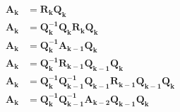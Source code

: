 \documentclass{article}
\newcommand{\mat}[1]{\mathbf{#1}}
\begin{document}
\begin{align}
  \mat{A_k} &= \mat{R_k}\mat{Q_k} \nonumber \\
  \mat{A_k} &= \mat{Q_k^{-1}}\mat{Q_k}\mat{R_k}\mat{Q_k} \nonumber \\
  \mat{A_k} &= \mat{Q_k^{-1}}\mat{A_{k-1}}\mat{Q_k} \nonumber \\
  \mat{A_k} &= \mat{Q_k^{-1}}\mat{R_{k-1}}\mat{Q_{k-1}}\mat{Q_k} \nonumber \\
  \mat{A_k} &= \mat{Q_k^{-1}}\mat{Q_{k-1}^{-1}}\mat{Q_{k-1}}\mat{R_{k-1}}\mat{Q_{k-1}}\mat{Q_k} \nonumber \\
  \mat{A_k} &= \mat{Q_k^{-1}}\mat{Q_{k-1}^{-1}}\mat{A_{k-2}}\mat{Q_{k-1}}\mat{Q_k} \nonumber \\
\end{align}
\end{document}
